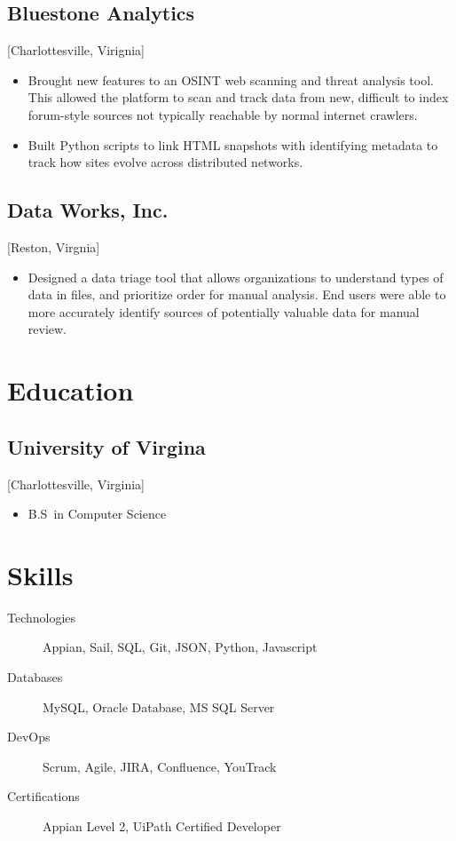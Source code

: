 \documentclass{mycv}
\begin{document}
\subsection{Bluestone Analytics}[Charlottesville, Virignia]
\begin{positions}
\end{positions}
\begin{itemize}
  \item Brought new features to an OSINT web scanning and threat analysis tool. This allowed the platform to scan and track data from new, difficult to index forum-style sources not typically reachable by normal internet crawlers.
  \item Built Python scripts to link HTML snapshots with identifying metadata to track how sites evolve across distributed networks.
\end{itemize}

\subsection{Data Works, Inc.}[Reston, Virgnia]
\begin{positions}
\end{positions}
\begin{itemize}
  \item Designed a data triage tool that allows organizations to understand types of data in files, and prioritize order for manual analysis. End users were able to more accurately identify sources of potentially valuable data for manual review.
\end{itemize}

\section{Education}

\subsection{University of Virgina}[Charlottesville, Virginia]
\vspace{-\parskip}%
\begin{itemize}[label={}]
  \item B.S\ in Computer Science 
\end{itemize}

\section{Skills}
\begin{description}
  \item[Technologies] Appian, Sail, SQL, Git, JSON, Python, Javascript
  \item[Databases] MySQL, Oracle Database, MS SQL Server
  \item[DevOps] Scrum, Agile, JIRA, Confluence, YouTrack
  \item[Certifications] Appian Level 2, UiPath Certified Developer
\end{description}
\end{document}
